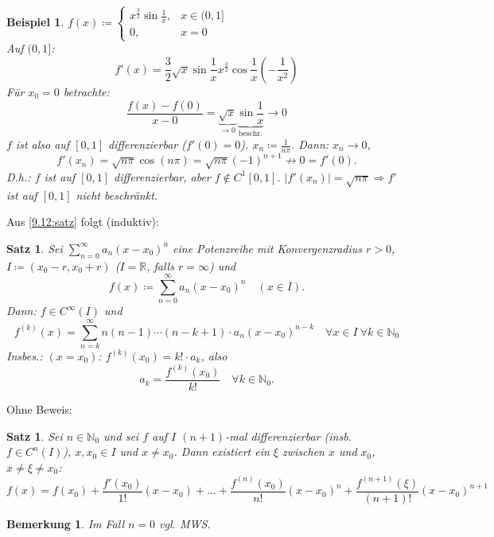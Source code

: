 \documentclass[12pt]{extreport} %
\newcommand{\N}{\mathbb{N}}
\newcommand{\R}{\mathbb{R}}
\theoremstyle{named}
\theoremstyle{dotless}
\newtheorem{satz}[unnamedtheorem]{Satz}
\newtheorem{beispiel}[unnamedtheorem]{Beispiel}
\newtheorem*{bemerkung}{Bemerkung}
\begin{document}
\begin{beispiel} \label{9.18:bsp}
	$f(x) \coloneqq \begin{cases} x^{\frac{3}{2}} \sin \frac{1}{x}, & x \in (0, 1] \\0, & x = 0 \end{cases}$ \\
	Auf $(0, 1]$: 
	$$ f'(x) = \frac{3}{2} \sqrt{x} \sin \frac{1}{x} x^{\frac{3}{2}} \cos \frac{1}{x} (-\frac{1}{x^{2}}) $$
	Für $x_{0} = 0$ betrachte:
	$$ \frac{f(x) - f(0)}{x - 0} = \underbrace{\sqrt{x}}_{\rightarrow 0} \underbrace{\sin \frac{1}{x}}_{\text{beschr.}} \rightarrow 0 $$
	$f$ ist also auf $[0, 1]$ differenzierbar ($f'(0) = 0$). $x_{n} \coloneqq \frac{1}{n \pi}$. Dann: $x_{n} \rightarrow 0$, 
		$$ f'(x_{n}) = \sqrt{n \pi} \cos(n \pi) = \sqrt{n \pi} (-1)^{n+1} \not\rightarrow 0 = f'(0). $$ 
	D.h.: $f$ ist auf $[0, 1]$ differenzierbar, aber $f \notin C^{1}[0, 1]$. $|f'(x_{n})| = \sqrt{n \pi} \Rightarrow f'$ ist auf $[0, 1]$ nicht beschränkt.
\end{beispiel}

Aus \ref{9.12:satz} folgt (induktiv):

\begin{satz} \label{9.19:satz}
	Sei $\sum_{n=0}^{\infty} a_{n} (x - x_{0})^{n}$ eine Potenzreihe mit Konvergenzradius $r > 0$, $I \coloneqq (x_{0} - r, x_{0} + r)$ ($I = \R$, falls $r = \infty$) und 
	$$ f(x) \coloneqq \sum_{n=0}^{\infty} a_{n} (x - x_{0})^{n} \quad (x \in I). $$
	Dann: $f \in C^{\infty}(I)$ und 
	$$ f^{(k)}(x) = \sum_{n=k}^{\infty} n(n-1) \cdots (n-k+1) \cdot a_{n} (x - x_{0})^{n-k} \quad \forall x \in I ~\forall k \in \N_{0} $$
	Insbes.: $(x = x_{0})$: $f^{(k)}(x_{0}) = k! \cdot a_{k}$, also
		$$ a_{k} = \frac{f^{(k)}(x_{0})}{k!} \quad \forall k \in \N_{0}. $$
\end{satz}

Ohne Beweis:

\begin{satz} \label{9.20:satz-Taylor}
	Sei $n \in \N_{0}$ und sei $f$ auf $I$ $(n+1)$-mal differenzierbar (insb. $f \in C^{n}(I)$), $x, x_{0} \in I$ und $x \neq x_{0}$. Dann existiert ein $\xi$ zwischen $x$ und $x_{0}$, $x \neq \xi \neq x_{0}$:
		$$ f(x) = f(x_{0}) + \frac{f'(x_{0})}{1!} (x - x_{0}) + \dotsc + \frac{f^{(n)}(x_{0})}{n!} (x - x_{0})^{n} + \frac{f^{(n+1)}(\xi)}{(n+1)!} (x - x_{0})^{n+1} $$
\end{satz}

\begin{bemerkung}
	Im Fall $n = 0$ vgl. MWS.	
\end{bemerkung}
\end{document}
